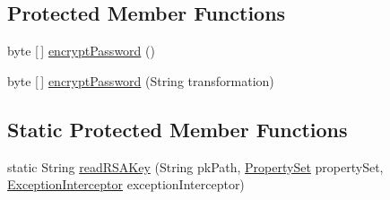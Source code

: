 \subsection*{Protected Member Functions}
\begin{DoxyCompactItemize}
\item 
byte \mbox{[}$\,$\mbox{]} \mbox{\hyperlink{classcom_1_1mysql_1_1cj_1_1protocol_1_1a_1_1authentication_1_1_sha256_password_plugin_a3a794d3a2b11d2227a8ed2c9eef79317}{encrypt\+Password}} ()
\item 
byte \mbox{[}$\,$\mbox{]} \mbox{\hyperlink{classcom_1_1mysql_1_1cj_1_1protocol_1_1a_1_1authentication_1_1_sha256_password_plugin_ae7d17c377f61765009f7d3ad92638f14}{encrypt\+Password}} (String transformation)
\end{DoxyCompactItemize}
\subsection*{Static Protected Member Functions}
\begin{DoxyCompactItemize}
\item 
static String \mbox{\hyperlink{classcom_1_1mysql_1_1cj_1_1protocol_1_1a_1_1authentication_1_1_sha256_password_plugin_a8c1b80061a111fd0e8e3518af26baeef}{read\+R\+S\+A\+Key}} (String pk\+Path, \mbox{\hyperlink{interfacecom_1_1mysql_1_1cj_1_1conf_1_1_property_set}{Property\+Set}} property\+Set, \mbox{\hyperlink{interfacecom_1_1mysql_1_1cj_1_1exceptions_1_1_exception_interceptor}{Exception\+Interceptor}} exception\+Interceptor)
\end{DoxyCompactItemize}
